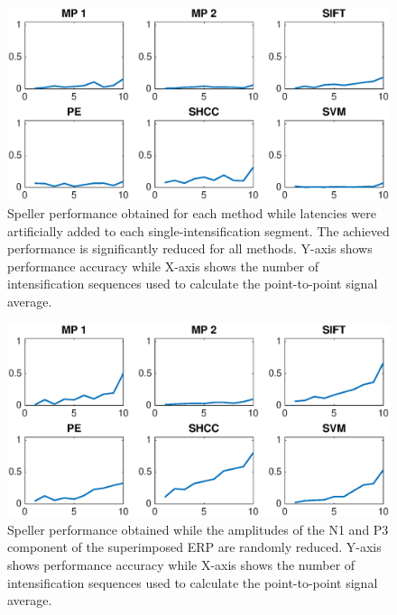 \documentclass[brainsci,article,submit,moreauthors,pdftex,10pt,a4paper]{mdpi}
\begin{document}
\begin{figure}[H]
\centering
\includegraphics[width=15cm]{images/CrossPerformanceTestLatency.eps}
\caption{Speller performance obtained for each method while latencies were artificially added to each single-intensification segment.  The achieved performance is significantly reduced for all methods. Y-axis shows performance accuracy while X-axis shows the number of intensification sequences used to calculate the point-to-point signal average.}
\label{fig:performancetestlatency}
\end{figure}


\begin{figure}[H]
\centering
\includegraphics[width=15cm]{images/CrossPerformanceTestAmplitude.eps}
\caption{Speller performance obtained while the amplitudes of the N1 and P3 component of the superimposed ERP are randomly reduced. Y-axis shows performance accuracy while X-axis shows the number of intensification sequences used to calculate the point-to-point signal average.}
\label{fig:performancetestamplitude}
\end{figure}
\end{document}
